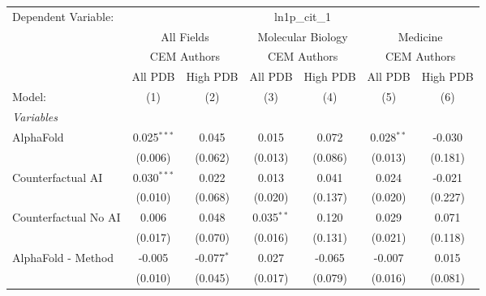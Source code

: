 \begingroup
\centering
\begin{tabular}{lcccccc}
   \tabularnewline \midrule \midrule
   Dependent Variable: & \multicolumn{6}{c}{ln1p\_cit\_1}\\
 & \multicolumn{2}{c}{All Fields} & \multicolumn{2}{c}{Molecular Biology} & \multicolumn{2}{c}{Medicine} \\
\cmidrule(lr){2-3} \cmidrule(lr){4-5} \cmidrule(lr){6-7}
 & \multicolumn{2}{c}{CEM Authors} & \multicolumn{2}{c}{CEM Authors} & \multicolumn{2}{c}{CEM Authors} \\
\cmidrule(lr){2-3} \cmidrule(lr){4-5} \cmidrule(lr){6-7}
 & \multicolumn{1}{c}{All PDB} & \multicolumn{1}{c}{High PDB} & \multicolumn{1}{c}{All PDB} & \multicolumn{1}{c}{High PDB} & \multicolumn{1}{c}{All PDB} & \multicolumn{1}{c}{High PDB} \\
\cmidrule(lr){2-2} \cmidrule(lr){3-3} \cmidrule(lr){4-4} \cmidrule(lr){5-5} \cmidrule(lr){6-6} \cmidrule(lr){7-7}
   Model:                                                     & (1)            & (2)          & (3)          & (4)     & (5)            & (6)\\  
   \midrule
   \emph{Variables}\\
   AlphaFold                                                  & 0.025$^{***}$  & 0.045        & 0.015        & 0.072   & 0.028$^{**}$   & -0.030\\   
                                                              & (0.006)        & (0.062)      & (0.013)      & (0.086) & (0.013)        & (0.181)\\   
   Counterfactual AI                                          & 0.030$^{***}$  & 0.022        & 0.013        & 0.041   & 0.024          & -0.021\\   
                                                              & (0.010)        & (0.068)      & (0.020)      & (0.137) & (0.020)        & (0.227)\\   
   Counterfactual No AI                                       & 0.006          & 0.048        & 0.035$^{**}$ & 0.120   & 0.029          & 0.071\\   
                                                              & (0.017)        & (0.070)      & (0.016)      & (0.131) & (0.021)        & (0.118)\\   
   AlphaFold - Method                                         & -0.005         & -0.077$^{*}$ & 0.027        & -0.065  & -0.007         & 0.015\\   
                                                              & (0.010)        & (0.045)      & (0.017)      & (0.079) & (0.016)        & (0.081)\\   

\end{tabular}
